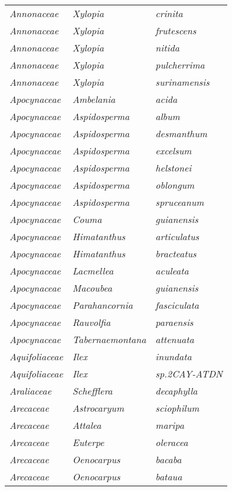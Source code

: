 \documentclass[fleqn,10pt]{ArtEcoFoG} %
\renewenvironment{table}{\begin{table*}}{\end{table*}\ignorespacesafterend}
\begin{document}
\begin{table}
\begin{tabular}[t]{lll}
\em{Annonaceae} & \em{Xylopia} & \em{crinita}\\
\addlinespace
\em{Annonaceae} & \em{Xylopia} & \em{frutescens}\\
\em{Annonaceae} & \em{Xylopia} & \em{nitida}\\
\em{Annonaceae} & \em{Xylopia} & \em{pulcherrima}\\
\em{Annonaceae} & \em{Xylopia} & \em{surinamensis}\\
\em{Apocynaceae} & \em{Ambelania} & \em{acida}\\
\addlinespace
\em{Apocynaceae} & \em{Aspidosperma} & \em{album}\\
\em{Apocynaceae} & \em{Aspidosperma} & \em{desmanthum}\\
\em{Apocynaceae} & \em{Aspidosperma} & \em{excelsum}\\
\em{Apocynaceae} & \em{Aspidosperma} & \em{helstonei}\\
\em{Apocynaceae} & \em{Aspidosperma} & \em{oblongum}\\
\addlinespace
\em{Apocynaceae} & \em{Aspidosperma} & \em{spruceanum}\\
\em{Apocynaceae} & \em{Couma} & \em{guianensis}\\
\em{Apocynaceae} & \em{Himatanthus} & \em{articulatus}\\
\em{Apocynaceae} & \em{Himatanthus} & \em{bracteatus}\\
\em{Apocynaceae} & \em{Lacmellea} & \em{aculeata}\\
\addlinespace
\em{Apocynaceae} & \em{Macoubea} & \em{guianensis}\\
\em{Apocynaceae} & \em{Parahancornia} & \em{fasciculata}\\
\em{Apocynaceae} & \em{Rauvolfia} & \em{paraensis}\\
\em{Apocynaceae} & \em{Tabernaemontana} & \em{attenuata}\\
\em{Aquifoliaceae} & \em{Ilex} & \em{inundata}\\
\addlinespace
\em{Aquifoliaceae} & \em{Ilex} & \em{sp.2CAY-ATDN}\\
\em{Araliaceae} & \em{Schefflera} & \em{decaphylla}\\
\em{Arecaceae} & \em{Astrocaryum} & \em{sciophilum}\\
\em{Arecaceae} & \em{Attalea} & \em{maripa}\\
\em{Arecaceae} & \em{Euterpe} & \em{oleracea}\\
\addlinespace
\em{Arecaceae} & \em{Oenocarpus} & \em{bacaba}\\
\em{Arecaceae} & \em{Oenocarpus} & \em{bataua}\\

\end{tabular}
\end{table}
\end{document}
